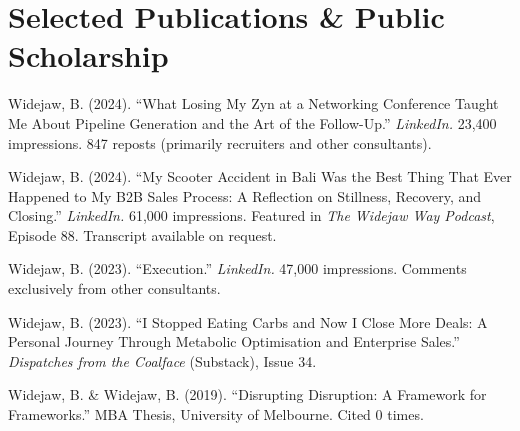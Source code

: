 \section*{Selected Publications \& Public Scholarship}

Widejaw, B. (2024). ``What Losing My Zyn at a Networking Conference Taught Me About Pipeline Generation and the Art of the Follow-Up.'' \textit{LinkedIn.} 23,400 impressions. 847 reposts (primarily recruiters and other consultants).

\vspace{4pt}
Widejaw, B. (2024). ``My Scooter Accident in Bali Was the Best Thing That Ever Happened to My B2B Sales Process: A Reflection on Stillness, Recovery, and Closing.'' \textit{LinkedIn.} 61,000 impressions. Featured in \textit{The Widejaw Way Podcast}, Episode 88. Transcript available on request.

\vspace{4pt}
Widejaw, B. (2023). ``Execution.'' \textit{LinkedIn.} 47,000 impressions. Comments exclusively from other consultants.

\vspace{4pt}
Widejaw, B. (2023). ``I Stopped Eating Carbs and Now I Close More Deals: A Personal Journey Through Metabolic Optimisation and Enterprise Sales.'' \textit{Dispatches from the Coalface} (Substack), Issue 34.

\vspace{4pt}
Widejaw, B. \& Widejaw, B. (2019). ``Disrupting Disruption: A Framework for Frameworks.'' MBA Thesis, University of Melbourne. Cited 0 times.
